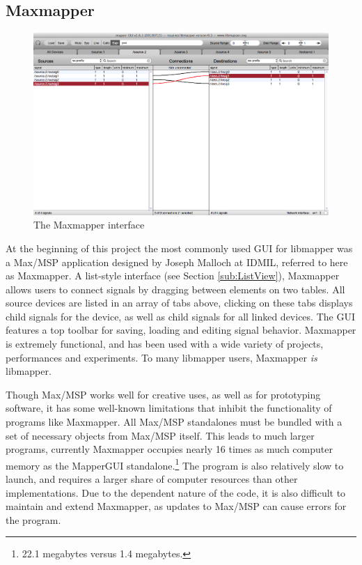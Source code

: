 	\subsection{Maxmapper} %
	\label{sub:maxmapper}

\begin{figure}[ht]
	\centering
	\includegraphics[width=\textwidth]{figures/maxmapper}
	\caption{The Maxmapper interface}
	\label{fig:maxmapper}
\end{figure}

At the beginning of this project the most commonly used GUI for libmapper was a Max/MSP application designed by Joseph Malloch at IDMIL, referred to here as Maxmapper. A list-style interface (see Section \ref{sub:ListView}), Maxmapper allows users to connect signals by dragging between elements on two tables. All source devices are listed in an array of tabs above, clicking on these tabs displays child signals for the device, as well as child signals for all linked devices. The GUI features a top toolbar for saving, loading and editing signal behavior. Maxmapper is extremely functional, and has been used with a wide variety of projects, performances and experiments. To many libmapper users, Maxmapper \emph{is} libmapper.
	
Though Max/MSP works well for creative uses, as well as for prototyping software, it has some well-known limitations that inhibit the functionality of programs like Maxmapper. All Max/MSP standalones must be bundled with a set of necessary objects from Max/MSP itself. This leads to much larger programs, currently Maxmapper occupies nearly 16 times as much computer memory as the MapperGUI standalone.\footnote{22.1 megabytes versus 1.4 megabytes.} The program is also relatively slow to launch, and requires a larger share of computer resources than other implementations. Due to the dependent nature of the code, it is also difficult to maintain and extend Maxmapper, as updates to Max/MSP can cause errors for the program.

